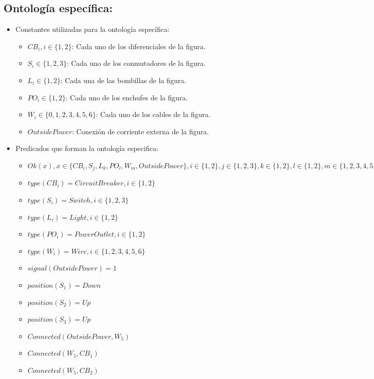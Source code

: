 \documentclass[10pt, a4paper,spanish]{article}
\begin{document}
		\subsection{Ontología específica:}

			\begin{itemize}

				\item Constantes utilizadas para la ontología específica:
				\begin{itemize}
					\item $CB_i, i \in \{1,2\}$: Cada uno de los diferenciales de la figura.
					\item $S_i \in \{1,2,3\}$:  Cada uno de los conmutadores de la figura.
					\item $L_i \in \{1,2\}$: Cada una de las bombillas de la figura.
					\item $PO_i \in \{1,2\}$: Cada uno de los enchufes de la figura.
					\item $W_i \in \{0,1,2,3,4,5,6\}$: Cada uno de los cables de la figura.
					\item $OutsidePower$: Conexión de corriente externa de la figura.
				\end{itemize}
				\item Predicados que forman la ontología especifica:
				\begin{itemize}
					\item $ Ok(x),  x \in \{CB_i, S_j, L_k, PO_l, W_m, OutsidePower\}, i \in \{1,2\}, j \in \{1,2,3\},k \in \{1,2\},l \in \{1,2\},m \in \{1,2,3,4,5,6\}$
					\item $ type(CB_i) = CircuitBreaker, i \in \{1,2\} $
					\item $ type(S_i) = Switch, i \in \{1,2, 3\} $
					\item $ type(L_i) = Light, i \in \{1,2\} $
					\item $ type(PO_i) = PowerOutlet, i \in \{1,2\} $
					\item $ type(W_i) = Wire, i \in \{1,2, 3, 4, 5, 6\} $
					\item $ signal(OutsidePower) = 1 $
					\item $ position(S_1) = Down $
					\item $ position(S_2) = Up $
					\item $ position(S_3) = Up $
					\item $ Connected(OutsidePower, W_5)$
					\item $ Connected(W_5, CB_1)$
					\item $ Connected(W_5, CB_2)$

\end{itemize}
\end{itemize}
\end{document}
